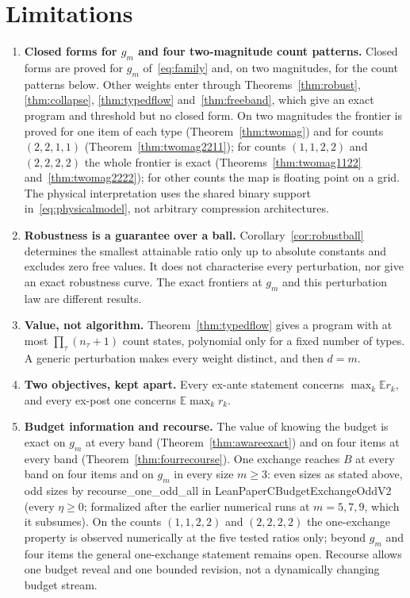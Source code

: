 \documentclass[conference]{IEEEtran}
\theoremstyle{definition}
\newcommand{\lean}[1]{\textsf{\footnotesize #1}}
\begin{document}

\section{Limitations}
\label{sec:limits}

\begin{enumerate}
\item[1)] \textbf{Closed forms for $g_m$ and four two-magnitude count patterns.} Closed forms
are proved for $g_{m}$ of~\eqref{eq:family} and, on two magnitudes, for the count patterns
below. Other weights enter through Theorems~\ref{thm:robust}, \ref{thm:collapse},
\ref{thm:typedflow} and~\ref{thm:freeband}, which give an exact program and threshold but no
closed form. On two magnitudes the frontier is proved for one item of each
type (Theorem~\ref{thm:twomag}) and for counts $(2,2,1,1)$ (Theorem~\ref{thm:twomag2211}); for
counts $(1,1,2,2)$ and $(2,2,2,2)$ the whole frontier is exact (Theorems~\ref{thm:twomag1122}
and~\ref{thm:twomag2222}); for other counts the map is floating point on a grid. The physical
interpretation uses the shared binary support in~\eqref{eq:physicalmodel}, not arbitrary
compression architectures.
\item[2)] \textbf{Robustness is a guarantee over a ball.} Corollary~\ref{cor:robustball}
determines the smallest attainable ratio only up to absolute constants and excludes zero
free values. It does not characterise every perturbation, nor give an exact robustness curve.
The exact frontiers at $g_m$ and this perturbation law are different results.
\item[3)] \textbf{Value, not algorithm.} Theorem~\ref{thm:typedflow} gives a program with
at most $\prod_\tau(n_\tau+1)$ count states, polynomial only for a fixed number of types. A generic
perturbation makes every weight distinct, and then $d=m$.
\item[4)] \textbf{Two objectives, kept apart.} Every ex-ante statement concerns
$\max_{k}\mathbb{E}r_{k}$, and every ex-post one concerns $\mathbb{E}\max_{k}r_{k}$.
\item[5)] \textbf{Budget information and recourse.} The value of knowing the budget is exact on
$g_m$ at every band (Theorem~\ref{thm:awareexact}) and on four items at every band
(Theorem~\ref{thm:fourrecourse}). One exchange reaches $B$ at every band on four items and on $g_m$
in every size $m\ge3$: even sizes as stated above, odd sizes by \lean{recourse\_one\_odd\_all} in
\lean{LeanPaperCBudgetExchangeOddV2} (every $\eta\ge0$; formalized after the earlier numerical runs at
$m=5,7,9$, which it subsumes). On the counts $(1,1,2,2)$ and $(2,2,2,2)$ the one-exchange property is
observed numerically at the five tested ratios only; beyond $g_m$ and four items the general
one-exchange statement remains open. Recourse allows one budget reveal and one bounded revision, not a
dynamically changing budget stream.
\end{enumerate}
\end{document}
